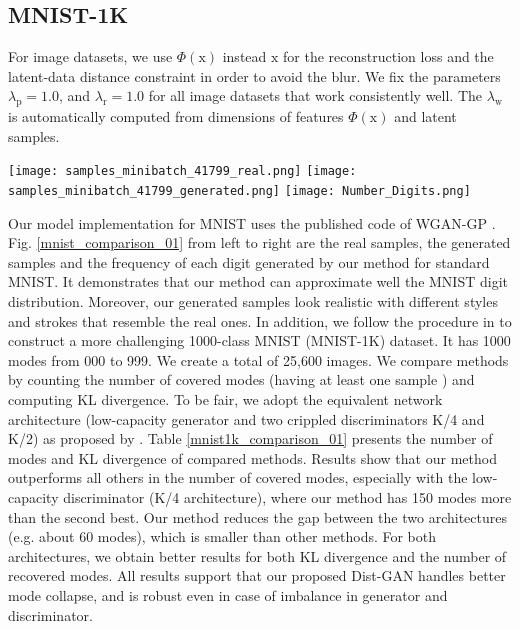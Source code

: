 \documentclass[runningheads]{llncs}
\newcommand*{\eg}{e.g. }
\begin{document}
\subsection{MNIST-1K}
For image datasets, we use $\Phi(\mathrm{x})$ instead $\mathrm{x}$ for the reconstruction loss and the latent-data distance constraint in order to avoid the blur. We fix the parameters $\lambda_{\mathrm{p}} = 1.0$, and $\lambda_{\mathrm{r}} = 1.0$ for all image datasets that work consistently well. The $\lambda_{\mathrm{w}}$ is automatically computed from dimensions of features $\Phi(\mathrm{x})$ and latent samples.
\begin{figure*}[t]
\centering
\texttt{[image: samples\_minibatch\_41799\_real.png]}
\texttt{[image: samples\_minibatch\_41799\_generated.png]}
\texttt{[image: Number\_Digits.png]}
\caption{The real and our generated samples in one mini-batch. And the number of generated samples per class obtained by our method on the MNIST dataset. We compare our frequency of generated samples to the ground-truth via KL divergence: KL = 0.01.}
\label{mnist_comparison_01}
\end{figure*}
Our model implementation for MNIST uses the published code of WGAN-GP \cite{gulrajani-arxiv-2017}. Fig. \ref{mnist_comparison_01} from left to right are the real samples, the generated samples and the  frequency of each digit generated by our method for standard MNIST. It demonstrates that our method can approximate well the MNIST digit distribution. Moreover, our generated samples look realistic with different styles and strokes that resemble the real ones. In addition, we follow the procedure in  \cite{metz-arxiv-2016} to construct a more challenging 1000-class MNIST (MNIST-1K) dataset. 
It has 1000 modes from 000 to 999. 
We create a total of 25,600 images. We compare methods by counting the number of covered modes (having at least one sample \cite{metz-arxiv-2016}) and computing KL divergence. To be fair, we adopt the equivalent network architecture (low-capacity generator and two crippled discriminators K/4 and K/2) as proposed by \cite{metz-arxiv-2016}. Table \ref{mnist1k_comparison_01} presents the number of modes and KL divergence of compared methods. Results show that our method outperforms all others in the number of covered modes, especially with the low-capacity discriminator (K/4 architecture), where our method has  150 modes more than the second best. Our method reduces the gap between the two architectures (\eg about 60 modes), which is smaller than other methods. For both architectures, we obtain better results for both KL divergence and the number of recovered modes. All results support that our proposed Dist-GAN handles better mode collapse, and is robust even in case of imbalance in generator and discriminator.
\end{document}
